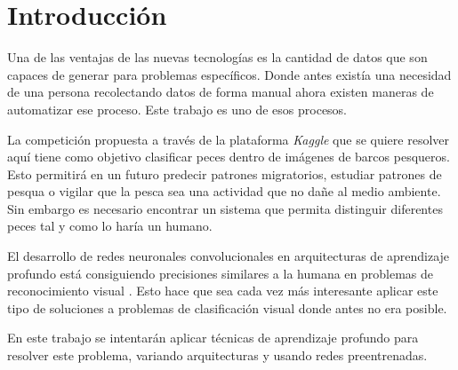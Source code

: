 
\chapter{Introducción} %
\label{Chapter1} %


\newcommand{\keyword}[1]{\textbf{#1}}
\newcommand{\tabhead}[1]{\textbf{#1}}
\newcommand{\code}[1]{\texttt{#1}}
\newcommand{\file}[1]{\texttt{\bfseries#1}}
\newcommand{\option}[1]{\texttt{\itshape#1}}


Una de las ventajas de las nuevas tecnologías es la cantidad de datos que son
capaces de generar para problemas específicos. Donde antes existía una
necesidad de una persona recolectando datos de forma manual ahora existen
maneras de automatizar ese proceso. Este trabajo es uno de esos procesos.

La competición propuesta a través de la plataforma \textit{Kaggle} que se
quiere resolver aquí tiene como objetivo clasificar peces dentro de imágenes de
barcos pesqueros. Esto permitirá en un futuro predecir patrones migratorios,
estudiar patrones de pesqua o vigilar que la pesca sea una actividad que no
dañe al medio ambiente. Sin embargo es necesario encontrar un sistema que
permita distinguir diferentes peces tal y como lo haría un humano.

El desarrollo de redes neuronales convolucionales en arquitecturas de
aprendizaje profundo está consiguiendo precisiones similares a la humana en
problemas de reconocimiento visual \parencite{taigman}. Esto hace que sea cada
vez más interesante aplicar este tipo de soluciones a problemas de
clasificación visual donde antes no era posible.

En este trabajo se intentarán aplicar técnicas de aprendizaje profundo para
resolver este problema, variando arquitecturas y usando redes preentrenadas. 

